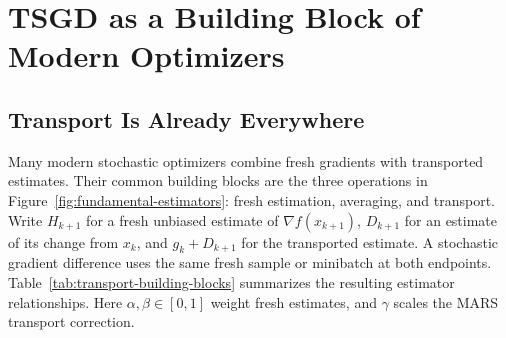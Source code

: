 \section{TSGD as a Building Block of Modern Optimizers}
\label{sec:connections}

\subsection{Transport Is Already Everywhere}
\label{subsec:refreshing-and-transporting}

Many modern stochastic optimizers combine fresh gradients with
transported estimates. Their common building blocks are the three
operations in Figure~\ref{fig:fundamental-estimators}: fresh estimation,
averaging, and transport. Write $H_{k+1}$ for a fresh unbiased estimate of
$\nabla f(x_{k+1})$, $D_{k+1}$ for an estimate of its change from $x_k$,
and $g_k+D_{k+1}$ for the transported estimate. A stochastic gradient
difference uses the same fresh sample or minibatch at both endpoints.
Table~\ref{tab:transport-building-blocks} summarizes the resulting
estimator relationships. Here $\alpha,\beta\in[0,1]$ weight fresh
estimates, and $\gamma$ scales the MARS transport correction.

